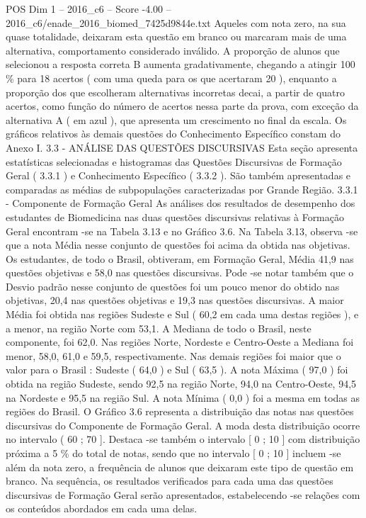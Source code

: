 \begin{textsample}{POS Dim 1 – 2016\_c6 – Score -4.00 – 2016\_c6/enade\_2016\_biomed\_7425d9844e.txt}
Aqueles com nota zero, na sua quase totalidade, deixaram esta questão em branco ou marcaram mais de uma alternativa, comportamento considerado inválido.
A proporção de alunos que selecionou a resposta correta B aumenta gradativamente, chegando a atingir 100 \% para 18 acertos ( com uma queda para os que acertaram 20 ), enquanto a proporção dos que escolheram alternativas incorretas decai, a partir de quatro acertos, como função do número de acertos nessa parte da prova, com exceção da alternativa A ( em azul ), que apresenta um crescimento no final da escala.
Os gráficos relativos às demais questões do Conhecimento Específico constam do Anexo I. 3.3 - ANÁLISE DAS QUESTÕES DISCURSIVAS Esta seção apresenta estatísticas selecionadas e histogramas das Questões Discursivas de Formação Geral ( 3.3.1 ) e Conhecimento Específico ( 3.3.2 ).
São também apresentadas e comparadas as médias de subpopulações caracterizadas por Grande Região. 3.3.1 - Componente de Formação Geral As análises dos resultados de desempenho dos estudantes de Biomedicina nas duas questões discursivas relativas à Formação Geral encontram -se na Tabela 3.13 e no Gráfico 3.6.
Na Tabela 3.13, observa -se que a nota Média nesse conjunto de questões foi acima da obtida nas objetivas.
Os estudantes, de todo o Brasil, obtiveram, em Formação Geral, Média 41,9 nas questões objetivas e 58,0 nas questões discursivas.
Pode -se notar também que o Desvio padrão nesse conjunto de questões foi um pouco menor do obtido nas objetivas, 20,4 nas questões objetivas e 19,3 nas questões discursivas.
A maior Média foi obtida nas regiões Sudeste e Sul ( 60,2 em cada uma destas regiões ), e a menor, na região Norte com 53,1.
A Mediana de todo o Brasil, neste componente, foi 62,0.
Nas regiões Norte, Nordeste e Centro-Oeste a Mediana foi menor, 58,0, 61,0 e 59,5, respectivamente.
Nas demais regiões foi maior que o valor para o Brasil : Sudeste ( 64,0 ) e Sul ( 63,5 ).
A nota Máxima ( 97,0 ) foi obtida na região Sudeste, sendo 92,5 na região Norte, 94,0 na Centro-Oeste, 94,5 na Nordeste e 95,5 na região Sul.
A nota Mínima ( 0,0 ) foi a mesma em todas as regiões do Brasil.
O Gráfico 3.6 representa a distribuição das notas nas questões discursivas do Componente de Formação Geral.
A moda desta distribuição ocorre no intervalo ( 60 ; 70 ].
Destaca -se também o intervalo [ 0 ; 10 ] com distribuição próxima a 5 \% do total de notas, sendo que no intervalo [ 0 ; 10 ] incluem -se além da nota zero, a frequência de alunos que deixaram este tipo de questão em branco.
Na sequência, os resultados verificados para cada uma das questões discursivas de Formação Geral serão apresentados, estabelecendo -se relações com os conteúdos abordados em cada uma delas.

\end{textsample}
